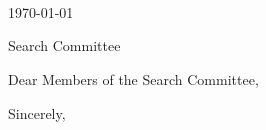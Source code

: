 \documentclass[11pt,letterpaper]{article}
\begin{document}
\thispagestyle{empty}

\noindent
\docauthor\\
\ifdefempty{\docaffiliation}{}{\docaffiliation\\}
\docemail\\
\ifdefempty{\docphone}{}{\docphone\\}
\dochomepage\\[1em]
\today

\vspace{1em}

\noindent
Search Committee\\

\vspace{1em}

\noindent Dear Members of the Search Committee,


\vspace{1em}

\noindent Sincerely,\\[2em]
\docauthor
\end{document}
